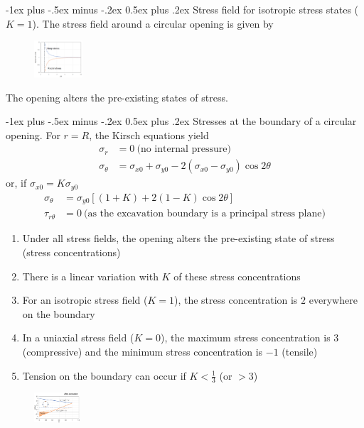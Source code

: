 \documentclass[10pt,landscape,a4paper]{article}
\makeatletter
\renewcommand{\section}{\@startsection{section}{1}{0mm}%
	{-1ex plus -.5ex minus -.2ex}%
	{0.5ex plus .2ex}%
	{\normalfont\large\bfseries}}
\makeatother
\begin{document}
\begin{multicols}{3}
	\section{Stress field for isotropic stress states ($K=1$).}
	The stress field around a circular opening is given by
	\begin{figure}[H]
		\centering
		\includegraphics[width=0.16\textwidth]{stress-field}
	\end{figure}
	The opening alters the pre-existing states of stress.
	
	\section{Stresses at the boundary of a circular opening.}
	For $r=R$, the Kirsch equations yield
	\begin{align*}
		\sigma_r      & = 0 \ \text{(no internal pressure)}                             \\
		\sigma_\theta & = \sigma_{x0}+\sigma_{y0}-2(\sigma_{x0}-\sigma_{y0})\cos2\theta
	\end{align*}
	or, if $\sigma_{x0}=K\sigma_{y0}$
	\begin{align*}
		\sigma_\theta  & = \sigma_{y0}\left[(1+K)+2(1-K)\cos2\theta\right]                     \\
		\tau_{r\theta} & = 0 \ \text{(as the excavation boundary is a principal stress plane)}
	\end{align*}
	\begin{enumerate}[label=(\alph*)]
		\item Under all stress fields, the opening alters the pre-existing state of stress (stress concentrations)
		\item There is a linear variation with $K$ of these stress concentrations
		\item For an isotropic stress field ($K=1$), the stress concentration is $2$ everywhere on the boundary
		\item In a uniaxial stress field ($K=0$), the maximum stress concentration is $3$ (compressive) and the minimum stress concentration is $-1$ (tensile)
		\item Tension on the boundary can occur if $K<\frac{1}{3}$ (or $>3$)
	\end{enumerate}
	\begin{figure}[H]
		\centering
		\includegraphics[width=0.15\textwidth]{stresses-boundary-circular-opening}
	\end{figure}
	

\end{multicols}
\end{document}
